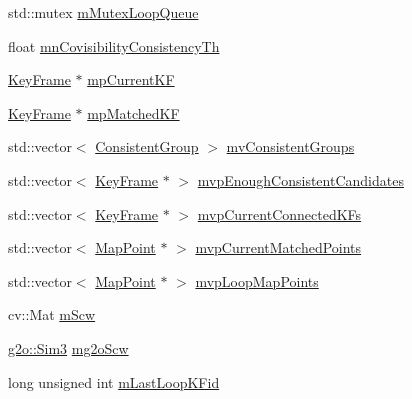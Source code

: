 \begin{DoxyCompactItemize}
std\+::mutex \mbox{\hyperlink{class_o_r_b___s_l_a_m2_1_1_loop_closing_a3c28fbf7b84469cd14b12f511d499533}{m\+Mutex\+Loop\+Queue}}
\item 
float \mbox{\hyperlink{class_o_r_b___s_l_a_m2_1_1_loop_closing_a78c93c677c23ca7bf62a2a9652c008ff}{mn\+Covisibility\+Consistency\+Th}}
\item 
\mbox{\hyperlink{class_o_r_b___s_l_a_m2_1_1_key_frame}{Key\+Frame}} $\ast$ \mbox{\hyperlink{class_o_r_b___s_l_a_m2_1_1_loop_closing_a4b6bc1810ef5921462ebdeee32508118}{mp\+Current\+KF}}
\item 
\mbox{\hyperlink{class_o_r_b___s_l_a_m2_1_1_key_frame}{Key\+Frame}} $\ast$ \mbox{\hyperlink{class_o_r_b___s_l_a_m2_1_1_loop_closing_a53d45d3e2f0a8e0c9797079b9ae4ea37}{mp\+Matched\+KF}}
\item 
std\+::vector$<$ \mbox{\hyperlink{class_o_r_b___s_l_a_m2_1_1_loop_closing_a8efed418be885643d3c43113ff1d7bb2}{Consistent\+Group}} $>$ \mbox{\hyperlink{class_o_r_b___s_l_a_m2_1_1_loop_closing_aede54de0cb62136859ccb297e890f573}{mv\+Consistent\+Groups}}
\item 
std\+::vector$<$ \mbox{\hyperlink{class_o_r_b___s_l_a_m2_1_1_key_frame}{Key\+Frame}} $\ast$ $>$ \mbox{\hyperlink{class_o_r_b___s_l_a_m2_1_1_loop_closing_ac545f793bc68348fea584022d1daa609}{mvp\+Enough\+Consistent\+Candidates}}
\item 
std\+::vector$<$ \mbox{\hyperlink{class_o_r_b___s_l_a_m2_1_1_key_frame}{Key\+Frame}} $\ast$ $>$ \mbox{\hyperlink{class_o_r_b___s_l_a_m2_1_1_loop_closing_ad9595220811b5b814d1413451ecbaa4d}{mvp\+Current\+Connected\+K\+Fs}}
\item 
std\+::vector$<$ \mbox{\hyperlink{class_o_r_b___s_l_a_m2_1_1_map_point}{Map\+Point}} $\ast$ $>$ \mbox{\hyperlink{class_o_r_b___s_l_a_m2_1_1_loop_closing_afd07791eb7a84ea2de2ab9d88e32d4dc}{mvp\+Current\+Matched\+Points}}
\item 
std\+::vector$<$ \mbox{\hyperlink{class_o_r_b___s_l_a_m2_1_1_map_point}{Map\+Point}} $\ast$ $>$ \mbox{\hyperlink{class_o_r_b___s_l_a_m2_1_1_loop_closing_a52778b54f944bab5a3580b82233e8c72}{mvp\+Loop\+Map\+Points}}
\item 
cv\+::\+Mat \mbox{\hyperlink{class_o_r_b___s_l_a_m2_1_1_loop_closing_abbb5a5f8a46de211d46aaa6129385ac2}{m\+Scw}}
\item 
\mbox{\hyperlink{structg2o_1_1_sim3}{g2o\+::\+Sim3}} \mbox{\hyperlink{class_o_r_b___s_l_a_m2_1_1_loop_closing_a9ea331d48d572c8e269c90d35c0de1e7}{mg2o\+Scw}}
\item 
long unsigned int \mbox{\hyperlink{class_o_r_b___s_l_a_m2_1_1_loop_closing_a6a6ee027c2c4c45fcd3811819c22953a}{m\+Last\+Loop\+K\+Fid}}

\end{DoxyCompactItemize}
